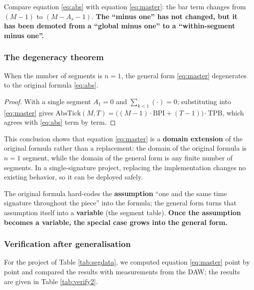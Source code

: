 \documentclass[11pt,a4paper]{article}
\begin{document}
\begin{remark}
Compare equation \eqref{eq:abs} with equation \eqref{eq:master}: the bar term changes
from $(M-1)$ to $(M-A_s-1)$. \textbf{The ``minus one'' has not changed, but it has been
demoted from a ``global minus one'' to a ``within-segment minus one''.}
\end{remark}

\subsubsection{The degeneracy theorem}

\begin{theorem}[Degeneracy]
When the number of segments is $n=1$, the general form \eqref{eq:master} degenerates to
the original formula \eqref{eq:abs}.
\end{theorem}

\begin{proof}
With a single segment $A_1=0$ and $\sum_{k<1}(\cdot)=0$; substituting into
\eqref{eq:master} gives
$\mathrm{AbsTick}(M,T)=\bigl((M-1)\cdot\mathrm{BPI}+(T-1)\bigr)\cdot\mathrm{TPB}$,
which agrees with \eqref{eq:abs} term by term.
\end{proof}

This conclusion shows that equation \eqref{eq:master} is a \textbf{domain extension} of
the original formula rather than a replacement: the domain of the original formula is
$n=1$ segment, while the domain of the general form is any finite number of segments.
In a single-signature project, replacing the implementation changes no existing
behavior, so it can be deployed safely.

\begin{remark}
The original formula hard-codes the \textbf{assumption} ``one and the same time
signature throughout the piece'' into the formula; the general form turns that
assumption itself into a \textbf{variable} (the segment table). \textbf{Once the
assumption becomes a variable, the special case grows into the general form.}
\end{remark}

\subsubsection{Verification after generalisation}

For the project of Table \ref{tab:segdata}, we computed equation \eqref{eq:master}
point by point and compared the results with measurements from the DAW; the results are
given in Table \ref{tab:verify2}.
\end{document}

